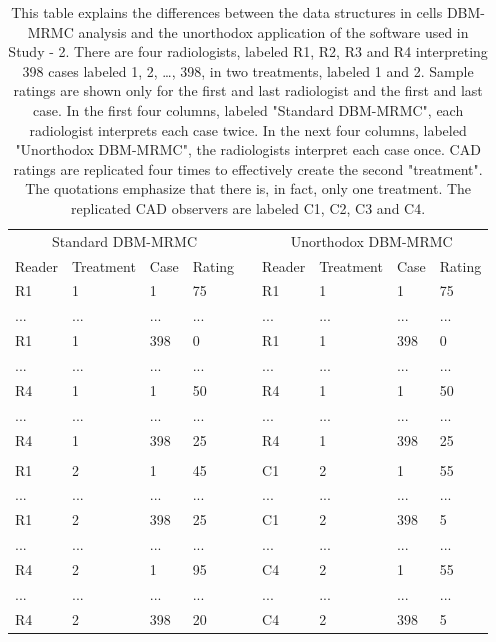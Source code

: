 \documentclass[
]{article}
\begin{document}
\begin{table}

\caption{\label{tab:standalone-cad-table-cells}This table explains the differences between the data structures in cells DBM-MRMC analysis and the unorthodox application of the software used in Study - 2. There are four radiologists, labeled R1, R2, R3 and R4 interpreting 398 cases labeled 1, 2, …, 398, in two treatments, labeled 1 and 2. Sample ratings are shown only for the first and last radiologist and the first and last case. In the first four columns, labeled "Standard DBM-MRMC", each radiologist interprets each case twice. In the next four columns, labeled "Unorthodox DBM-MRMC", the radiologists interpret each case once. CAD ratings are replicated four times to effectively create the second "treatment". The quotations emphasize that there is, in fact, only one treatment. The replicated CAD observers are labeled C1, C2, C3 and C4.}
\centering
\begin{tabular}[t]{lllllllll}
\toprule
\multicolumn{4}{c}{Standard DBM-MRMC} & \multicolumn{1}{c}{} & \multicolumn{4}{c}{Unorthodox DBM-MRMC} \\
\cmidrule(l{3pt}r{3pt}){1-4} \cmidrule(l{3pt}r{3pt}){6-9}
Reader & Treatment & Case & Rating &  & Reader & Treatment & Case & Rating\\
\midrule
R1 & 1 & 1 & 75 &  & R1 & 1 & 1 & 75\\
... & ... & ... & ... &  & ... & ... & ... & ...\\
R1 & 1 & 398 & 0 &  & R1 & 1 & 398 & 0\\
... & ... & ... & ... &  & ... & ... & ... & ...\\
R4 & 1 & 1 & 50 &  & R4 & 1 & 1 & 50\\
\addlinespace
... & ... & ... & ... &  & ... & ... & ... & ...\\
R4 & 1 & 398 & 25 &  & R4 & 1 & 398 & 25\\
 &  &  &  &  &  &  &  & \\
R1 & 2 & 1 & 45 &  & C1 & 2 & 1 & 55\\
... & ... & ... & ... &  & ... & ... & ... & ...\\
\addlinespace
R1 & 2 & 398 & 25 &  & C1 & 2 & 398 & 5\\
... & ... & ... & ... &  & ... & ... & ... & ...\\
R4 & 2 & 1 & 95 &  & C4 & 2 & 1 & 55\\
... & ... & ... & ... &  & ... & ... & ... & ...\\
R4 & 2 & 398 & 20 &  & C4 & 2 & 398 & 5\\
\bottomrule
\end{tabular}
\end{table}
\end{document}
